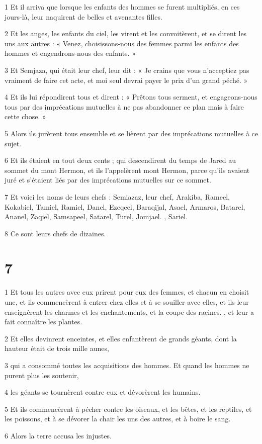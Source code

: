 \par 1 Et il arriva que lorsque les enfants des hommes se furent multipliés, en ces jours-là, leur naquirent de belles et avenantes filles.
\par 2 Et les anges, les enfants du ciel, les virent et les convoitèrent, et se dirent les uns aux autres : « Venez, choisissons-nous des femmes parmi les enfants des hommes et engendrons-nous des enfants. »
\par 3 Et Semjaza, qui était leur chef, leur dit : « Je crains que vous n'acceptiez pas vraiment de faire cet acte, et moi seul devrai payer le prix d'un grand péché. »
\par 4 Et ils lui répondirent tous et dirent : « Prêtons tous serment, et engageons-nous tous par des imprécations mutuelles à ne pas abandonner ce plan mais à faire cette chose. »
\par 5 Alors ils jurèrent tous ensemble et se lièrent par des imprécations mutuelles à ce sujet.
\par 6 Et ils étaient en tout deux cents ; qui descendirent du temps de Jared au sommet du mont Hermon, et ils l'appelèrent mont Hermon, parce qu'ils avaient juré et s'étaient liés par des imprécations mutuelles sur ce sommet.
\par 7 Et voici les noms de leurs chefs : Semiazaz, leur chef, Arakiba, Rameel, Kokabiel, Tamiel, Ramiel, Danel, Ezeqeel, Baraqijal, Asael, Armaros, Batarel, Ananel, Zaqiel, Samsapeel, Satarel, Turel, Jomjael. , Sariel.
\par 8 Ce sont leurs chefs de dizaines.

\chapter{7}

\par 1 Et tous les autres avec eux prirent pour eux des femmes, et chacun en choisit une, et ils commencèrent à entrer chez elles et à se souiller avec elles, et ils leur enseignèrent les charmes et les enchantements, et la coupe des racines. , et leur a fait connaître les plantes.
\par 2 Et elles devinrent enceintes, et elles enfantèrent de grands géants, dont la hauteur était de trois mille aunes,
\par 3 qui a consommé toutes les acquisitions des hommes. Et quand les hommes ne purent plus les soutenir,
\par 4 les géants se tournèrent contre eux et dévorèrent les humains.
\par 5 Et ils commencèrent à pécher contre les oiseaux, et les bêtes, et les reptiles, et les poissons, et à se dévorer la chair les uns des autres, et à boire le sang.
\par 6 Alors la terre accusa les injustes.


